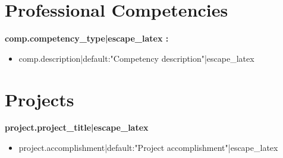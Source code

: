 \documentclass[11pt,letterpaper]{article}
\begin{document}
{{{{{{{{{{{%

{%
\section{Professional Competencies}

{%
\noindent\textbf{ {{ comp.competency_type|escape_latex }}: } \\
\vspace{-6pt}
\begin{itemize}[leftmargin=15pt,itemsep=1pt,parsep=0pt,topsep=2pt]
    \item {{ comp.description|default:"Competency description"|escape_latex }}
\end{itemize}
\vspace{4pt}

{%
{%


{%
\section{Projects}

{%
\noindent\textbf{ {{ project.project_title|escape_latex }} }{%
{%
\vspace{-6pt}
\begin{itemize}[leftmargin=15pt,itemsep=1pt,parsep=0pt,topsep=2pt]
    \item {{ project.accomplishment|default:"Project accomplishment"|escape_latex }}
\end{itemize}
\vspace{4pt}

{%
{%


}}}}}}}}}}}}}}}}}}}}}
\end{document}
